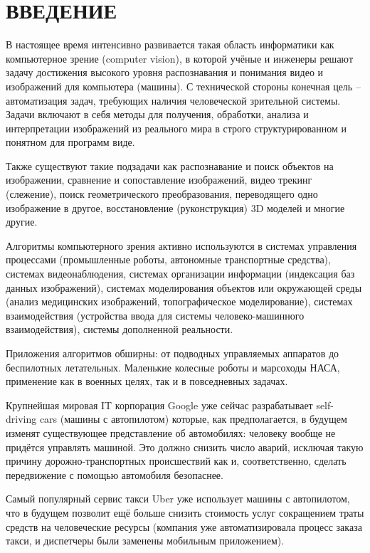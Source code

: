 \chapter*{ВВЕДЕНИЕ}

В настоящее время интенсивно развивается такая область информатики как компьютерное зрение (computer vision), в которой учёные и инженеры решают задачу достижения высокого уровня распознавания и понимания видео и изображений для компьютера (машины). С технической стороны конечная цель -- автоматизация задач, требующих наличия человеческой зрительной системы. Задачи включают в себя методы для получения, обработки, анализа и интерпретации изображений из реального мира в строго структурированном и понятном для программ виде.

Также существуют такие подзадачи как распознавание и поиск объектов на изображении, сравнение и сопоставление изображений, видео трекинг (слежение), поиск геометрического преобразования, переводящего одно изображение в другое, восстановление (руконструкция) 3D моделей и многие другие.

Алгоритмы компьютерного зрения активно используются в системах управления процессами (промышленные роботы, автономные транспортные средства), системах видеонаблюдения, системах организации информации (индексация баз данных изображений), системах моделирования объектов или окружающей среды (анализ медицинских изображений, топографическое моделирование), системах взаимодействия (устройства ввода для системы человеко-машинного взаимодействия), системы дополненной реальности.

Приложения алгоритмов обширны: от подводных управляемых аппаратов до беспилотных летательных. Маленькие колесные роботы и марсоходы НАСА, применение как в военных целях, так и в повседневных задачах.

Крупнейшая мировая IT корпорация Google уже сейчас разрабатывает self-driving cars (машины с автопилотом) которые, как предполагается, в будущем изменят существующее представление об автомобилях: человеку вообще не придётся управлять машиной. Это должно снизить число аварий, исключая такую причину дорожно-транспортных происшествий как  и, соответственно, сделать передвижение с помощью автомобиля безопаснее.

Самый популярный сервис такси Uber уже использует машины с автопилотом, что в будущем позволит ещё больше снизить стоимость услуг сокращением траты средств на человеческие ресурсы (компания уже автоматизировала процесс заказа такси, и диспетчеры были заменены мобильным приложением).

